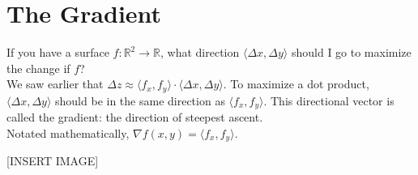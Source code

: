 \section{The Gradient}
\noindent
If you have a surface $f: \mathbb{R}^2 \to \mathbb{R}$, what direction $\langle \Delta x, \Delta y \rangle$ should I go to maximize the change if $f$?\\
We saw earlier that $\Delta z\approx \langle f_x, f_y \rangle \cdot \langle \Delta x, \Delta y \rangle$. To maximize a dot product, $\langle \Delta x, \Delta y \rangle$ should be in the same direction as $\langle f_x, f_y \rangle$. This directional vector is called the gradient: the direction of steepest ascent.\\
Notated mathematically, $\nabla f(x,y) = \langle f_x, f_y \rangle$.

[INSERT IMAGE]



